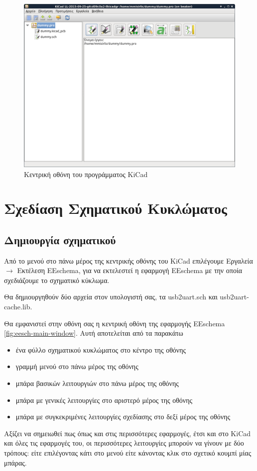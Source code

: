 \documentclass[a4paper]{article}
\begin{document}
\begin{figure}
  \begin{center}
    \includegraphics[width=.9\textwidth]{img/kicad-main-window}
    \caption{Κεντρική οθόνη του προγράμματος KiCad}
    \label{fig:kicad-main-window}
  \end{center}
\end{figure}


\section{Σχεδίαση Σχηματικού Κυκλώματος}

\subsection{Δημιουργία σχηματικού}
Από το μενού στο πάνω μέρος της κεντρικής οθόνης του \textenglish{KiCad} επιλέγουμε Εργαλεία $\rightarrow$ Εκτέλεση \textenglish{EEschema}, για να εκτελεστεί η εφαρμογή \textenglish{EEschema} με την οποία σχεδιάζουμε το σχηματικό κύκλωμα. 

Θα δημιουργηθούν δύο αρχεία στον υπολογιστή σας, τα usb2uart.sch και usb2uart-cache.lib. 

Θα εμφανιστεί στην οθόνη σας η κεντρική οθόνη της εφαρμογής \textenglish{EEschema} \ref{fig:eesch-main-window}. Αυτή αποτελείται από τα παρακάτω
\begin{itemize}
    \item ένα φύλλο σχηματικού κυκλώματος στο κέντρο της οθόνης
    \item γραμμή μενού στο πάνω μέρος της οθόνης
    \item μπάρα βασικών λειτουργιών στο πάνω μέρος της οθόνης
    \item μπάρα με γενικές λειτουργίες στο αριστερό μέρος της οθόνης
    \item μπάρα με συγκεκριμένες λειτουργίες σχεδίασης στο δεξί μέρος της οθόνης
\end{itemize}
Αξίζει να σημειωθεί πως όπως και στις περισσότερες εφαρμογές, έτσι και στο \textenglish{KiCad} και όλες τις εφαρμογές του, οι περισσότερες λειτουργίες μπορούν να γίνουν με δύο τρόπους: είτε επιλέγοντας κάτι στο μενού είτε κάνοντας κλικ στο σχετικό κουμπί μίας μπάρας.
\end{document}
